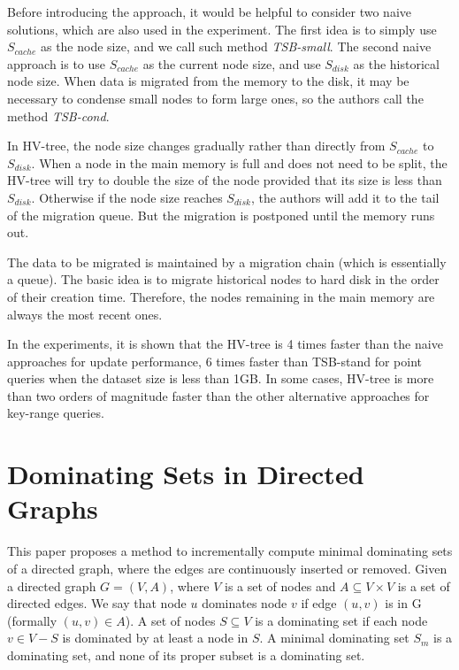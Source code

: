 \documentclass[paper=a4, fontsize=18pt]{article} %
\numberwithin{equation}{section} %
\numberwithin{figure}{section} %
\numberwithin{table}{section} %
\begin{document}
Before introducing the approach, it would be helpful to consider two naive solutions, which are also used in the experiment. The first idea is to simply use $S_{cache}$ as the node size, and we call such method \emph{TSB-small}. The second naive approach is to use $S_{cache}$ as the current node size, and use $S_{disk}$ as the historical node size. When data is migrated from the memory to the disk, it may be necessary to condense small nodes to form large ones, so the authors call the method \emph{TSB-cond}.

In HV-tree, the node size changes gradually rather than directly from $S_{cache}$ to $S_{disk}$. When a node in the main memory is full and does not need to be split, the HV-tree will try to double the size of the node provided that its size is less than $S_{disk}$. Otherwise if the node size reaches $S_{disk}$, the authors will add it to the tail of the migration queue. But the migration is postponed until the memory runs out.

The data to be migrated is maintained by a migration chain (which is essentially a queue). The basic idea is to migrate historical nodes to hard disk in the order of their creation time. Therefore, the nodes remaining in the main memory are always the most recent ones.

In the experiments, it is shown that the HV-tree is 4 times faster than the naive approaches for update performance, 6 times faster than TSB-stand for point queries when the dataset size is less than 1GB. In some cases, HV-tree is more than two orders of magnitude faster than the other alternative approaches for key-range queries.

\section{Dominating Sets in Directed Graphs \cite{PZZW10}}

This paper proposes a method to incrementally compute minimal dominating sets of a directed graph, where the edges are continuously inserted or removed. Given a directed graph $G = (V, A)$, where $V$ is a set of nodes and $A \subseteq V \times V$ is a set of directed edges. We say that node $u$ dominates node $v$ if edge $(u, v)$ is in G (formally $(u,v) \in A$). A set of nodes $S \subseteq V$ is a dominating set if each node $v \in V - S$ is dominated by at least a node in $S$. A minimal dominating set $S_m$ is a dominating set, and none of its proper subset is a dominating set.
\end{document}
